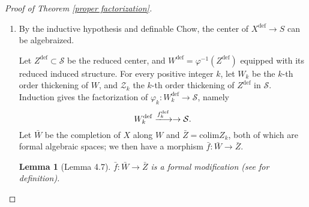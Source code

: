 \documentclass{amsart}
\newtheorem{lemma}[theorem]{Lemma}
\theoremstyle{definition}
\numberwithin{equation}{section}
\newcommand{\definable}{\mathrm{def}}
\begin{document}
\begin{proof}[Proof of Theorem \ref{proper factorization}]
\begin{enumerate}
    Obviously $\mathrm{Hilb}(X_{\mathcal{U}})$ is an open subset of $\mathrm{Hilb}(X)$.
    Let $B$ be the closure of the image of $U$ in $\mathrm{Hilb}(X)$,
    $V_B \to B$ the restriction of the universal family,
    $\widetilde{B} \to B$ the normalization,
    and $V_{\widetilde{B}}\to B$ the base-change of the universal family. We then have solid diagrams
    \[\begin{tikzcd}[sep = small]
      &                           & V_{\widetilde{B}} \arrow[ld] \arrow[rd] &                          &  &                         & (V_{\widetilde{B}})^\definable \arrow[ld] \arrow[rd] \arrow[dd] &                                                     \\
      & V_B \arrow[rd] \arrow[ld] &                                         & \widetilde{B} \arrow[ld] &  & X^\definable \arrow[rd] &                                                                 & \widetilde{B}^\definable \arrow[ld, "\psi", dashed] \\
    X &                           & B                                       &                          &  &                         & \mathcal{S}                                                     &
    \end{tikzcd}\]
    The resulting morphism $\psi$ is a proper modification, as it is proper
    ($(V_{\widetilde{B}})^\definable$ $\to \mathcal{S}$ is proper and $V_{\widetilde{B}}\to \widetilde{B}$ is surjective)
    and an isomorphism over $\mathcal{U}$.

    \item
    By the inductive hypothesis and definable Chow, the center of $X^\definable \to S$ can be algebraized.

    Let $Z^\definable \subset \mathcal{S}$ be the reduced center, and $W^\definable = \varphi^{-1}(Z^\definable)$
    equipped with its reduced induced structure.
    For every positive integer $k$, let $W_k$ be the $k$-th order thickening of $W$,
    and $\mathcal{Z}_k$ the $k$-th order thickening of $Z^\definable$ in $\mathcal{S}$.
    Induction gives the factorization of $\varphi_k: W_k^\definable \to \mathcal{S}$, namely
    \[
      W_k^\definable  \xlongrightarrow{f_k^\definable} \to \mathcal{S}.
    \]
    Let $\bar{W}$ be the completion of $X$ along $W$ and $\bar{Z} = \mathrm{colim} Z_k$,
    both of which are formal algebraic spaces; we then have a morphism $\bar{f}: \bar{W} \to \bar{Z}$.

    \begin{lemma}[Lemma 4.7]
      $\bar{f}: \bar{W} \to \bar{Z}$ is a formal modification (see \cite[Definition (1.7)]{zbMATH03283964} for definition).
    \end{lemma}


\end{enumerate}
\end{proof}
\end{document}
